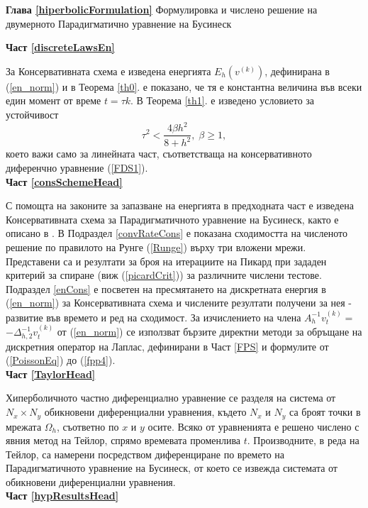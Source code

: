 \documentclass[a4paper]{article}
\newcommand{\be}{\begin{equation}}
\newcommand{\ee}{\end{equation}}
\newcommand{\rf}[1]{(\ref{#1})}
\theoremstyle{remark}
\begin{document}
\begin{large}
\textbf{Глава \ref{hiperbolicFormulation}} Формулировка и числено решение на двумерното Парадигматично уравнение на Бусинеск

\textbf{Част \ref{discreteLawsEn}}

За Консервативната схема е изведена енергията $E_h(v^{(k)})$, дефинирана в \rf{en_norm} и в Теорема \ref{th0}. е показано, че тя е константна величина във всеки един момент от време $t=\tau k$. В Теорема \ref{th1}. е изведено условието за устойчивост
\be
\tau^2 < \frac{ 4 \beta h^2 } { 8 + h^2}, \; \beta \ge 1,
\ee 
което важи само за линейната част, съответстваща на консервативното диференчно уравнение \rf{FDS1}.\\

\textbf{Част \ref{consSchemeHead}}

С помощта на законите за запазване на енергията в предходната част е изведена Консервативната схема за Парадигматичното уравнение на Бусинеск, както е описано в \cite{ref25}. В Подраздел \ref{convRateCons} е показана сходимостта на численото решение по правилото на Рунге \rf{Runge} върху три вложени мрежи. Представени са и резултати за броя на итерациите на Пикард при зададен критерий за спиране (виж \rf{picardCrit}) за различните числени тестове. Подраздел \ref{enCons} е посветен на пресмятането на дискретната енергия в \rf{en_norm} за Консервативната схема и числените резултати получени за нея - развитие във времето и ред на сходимост. За изчислението на члена $A_h^{-1}v_{t}^{(k)}=$ $-\Delta_{h,2}^{-1}v_{t}^{(k)}$ от \rf{en_norm} се използват бързите директни методи за обръщане на дискретния оператор на Лаплас, дефинирани в Част \ref{FPS} и формулите от \rf{PoissonEq} до \rf{fpp4}.\\

\textbf{Част \ref{TaylorHead}}

Хиперболичното частно диференциално уравнение се разделя на система от $N_x \times N_y$ обикновени диференциални уравнения, където $N_x$ и $N_y$ са броят точки в мрежата $\Omega_h$, съответно по $x$ и $y$ осите. Всяко от уравненията е решено числено с явния метод на Тейлор, спрямо времевата променлива $t$. Производните, в реда на Тейлор, са намерени посредством диференциране по времето на Парадигматичното уравнение на Бусинеск, от което се извежда системата от обикновени диференциални уравнения.\\

\textbf{Част \ref{hypResultsHead}}


\end{large}
\end{document}
